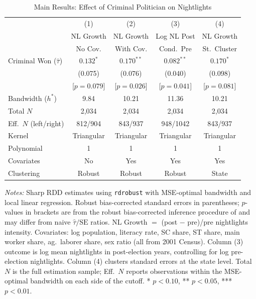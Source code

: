 \documentclass[12pt]{article}
\begin{document}
\begin{table}[H]
\centering
\caption{Main Results: Effect of Criminal Politician on Nightlights}
\label{tab:main_nl}
\begin{threeparttable}
\begin{tabular}{lcccc}
\toprule
 & (1) & (2) & (3) & (4) \\
 & NL Growth & NL Growth & Log NL Post & NL Growth \\
 & No Cov. & With Cov. & Cond.\ Pre & St.\ Cluster \\
\midrule
Criminal Won ($\hat{\tau}$) & $0.132^{*}$ & $0.170^{**}$ & $0.082^{**}$ & $0.170^{*}$ \\
 & (0.075) & (0.076) & (0.040) & (0.098) \\
 & [$p=0.079$] & [$p=0.026$] & [$p=0.041$] & [$p=0.081$] \\[6pt]
Bandwidth ($h^*$) & 9.84 & 10.21 & 11.36 & 10.21 \\
Total $N$ & 2,034 & 2,034 & 2,034 & 2,034 \\
Eff.\ $N$ (left/right) & 812/904 & 843/937 & 948/1042 & 843/937 \\
Kernel & Triangular & Triangular & Triangular & Triangular \\
Polynomial & 1 & 1 & 1 & 1 \\
Covariates & No & Yes & Yes & Yes \\
Clustering & Robust & Robust & Robust & State \\
\bottomrule
\end{tabular}
\begin{tablenotes}[flushleft]
\small
\item \textit{Notes:} Sharp RDD estimates using \texttt{rdrobust} with MSE-optimal bandwidth and local linear regression. Robust bias-corrected standard errors in parentheses; $p$-values in brackets are from the robust bias-corrected inference procedure of \citet{calonico2014} and may differ from naive $\hat{\tau}/\text{SE}$ ratios. NL Growth $=$ (post $-$ pre)/pre nightlights intensity. Covariates: log population, literacy rate, SC share, ST share, main worker share, ag.\ laborer share, sex ratio (all from 2001 Census). Column (3) outcome is log mean nightlights in post-election years, controlling for log pre-election nightlights. Column (4) clusters standard errors at the state level. Total $N$ is the full estimation sample; Eff.\ $N$ reports observations within the MSE-optimal bandwidth on each side of the cutoff. * $p<0.10$, ** $p<0.05$, *** $p<0.01$.
\end{tablenotes}
\end{threeparttable}
\end{table}
\end{document}
